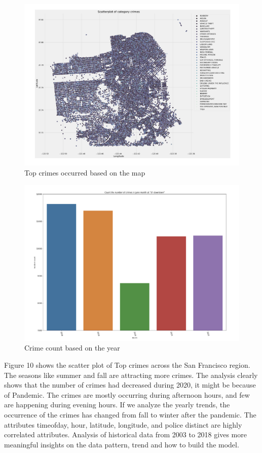 \documentclass[conference,final,]{IEEEtran}
\begin{document}
\begin{figure}

{\centering \includegraphics[width=0.7\linewidth]{img/fig10} 

}

\caption{Top crimes occurred based on the map}\label{fig:unnamed-chunk-10}
\end{figure}

\begin{figure}

{\centering \includegraphics[width=0.5\linewidth]{img/fig11} 

}

\caption{Crime count based on the year}\label{fig:unnamed-chunk-11}
\end{figure}

Figure 10 shows the scatter plot of Top crimes across the San Francisco
region. The seasons like summer and fall are attracting more crimes. The
analysis clearly shows that the number of crimes had decreased during
2020, it might be because of Pandemic. The crimes are mostly occurring
during afternoon hours, and few are happening during evening hours. If
we analyze the yearly trends, the occurrence of the crimes has changed
from fall to winter after the pandemic. The attributes timeofday, hour,
latitude, longitude, and police distinct are highly correlated
attributes. Analysis of historical data from 2003 to 2018 gives more
meaningful insights on the data pattern, trend and how to build the
model.
\end{document}

